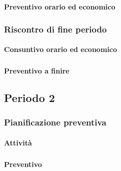 \planningTable{
	
}

\paragraph{Preventivo orario ed economico}
\subparagraph*{}

\contabilitaTable{
	
}

\subsubsection{Riscontro di fine periodo}


\paragraph{Consuntivo orario ed economico}
\subparagraph*{}

\contabilitaTable{
	
}


\paragraph{Preventivo a finire}
\subparagraph*{}

\pafTable{
	
}



\pagebreak
\subsection{Periodo 2}

\subsubsection{Pianificazione preventiva}

\paragraph{Attività}
\subparagraph*{}

\planningTable{
	
}

\paragraph{Preventivo}
\subparagraph*{}

